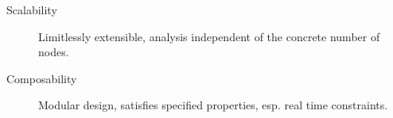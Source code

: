 \begin{description}
	\item[Scalability] Limitlessly extensible, analysis independent of the concrete number of nodes.
	\item[Composability] Modular design, satisfies specified properties, esp. real time constraints.
\end{description}
